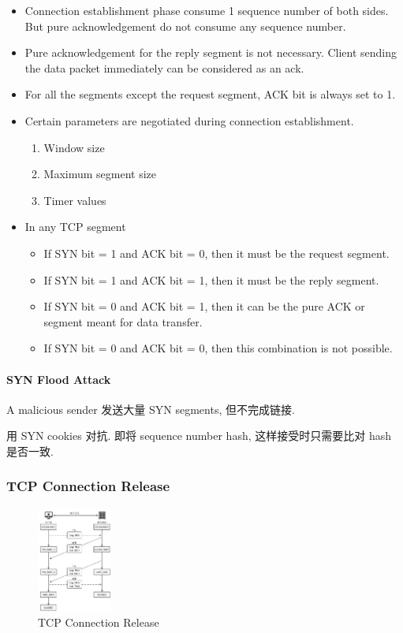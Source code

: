 \begin{itemize}\small
    \item Connection establishment phase consume 1 sequence number of both sides. But pure acknowledgement do not consume any sequence number. 
    \item Pure acknowledgement for the reply segment is not necessary. Client sending the data packet immediately can be considered as an ack. 
    \item For all the segments except the request segment, ACK bit is always set to 1.
    \item Certain parameters are negotiated during connection establishment. 
    \begin{enumerate}
        \item Window size
        \item Maximum segment size
        \item Timer values
    \end{enumerate}
    \item In any TCP segment
    \begin{itemize}\scriptsize
        \item If SYN bit = 1 and ACK bit = 0, then it must be the request
        segment.
        \item If SYN bit = 1 and ACK bit = 1, then it must be the reply segment.
        \item If SYN bit = 0 and ACK bit = 1, then it can be the pure ACK or segment meant for data transfer.
        \item If SYN bit = 0 and ACK bit = 0, then this combination is not possible.
    \end{itemize}
\end{itemize}

\paragraph{\textbf{SYN Flood} Attack} A malicious sender 发送大量 SYN segments, 但不完成链接.

用 SYN cookies 对抗. 即将 sequence number hash, 这样接受时只需要比对 hash 是否一致. 

\subsubsection{TCP Connection Release}
\begin{figure}[!htb]
    \centering
    \includegraphics[width=0.22\textwidth]{pic/CN6/TCP Connection Release}
    \caption{TCP Connection Release}
\end{figure}

